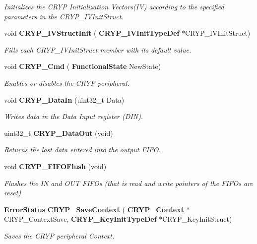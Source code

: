 \begin{DoxyCompactItemize}
\begin{DoxyCompactList}\small\item\em Initializes the C\+R\+YP Initialization Vectors(\+I\+V) according to the specified parameters in the C\+R\+Y\+P\+\_\+\+I\+V\+Init\+Struct. \end{DoxyCompactList}\item 
void \textbf{ C\+R\+Y\+P\+\_\+\+I\+V\+Struct\+Init} (\textbf{ C\+R\+Y\+P\+\_\+\+I\+V\+Init\+Type\+Def} $\ast$C\+R\+Y\+P\+\_\+\+I\+V\+Init\+Struct)
\begin{DoxyCompactList}\small\item\em Fills each C\+R\+Y\+P\+\_\+\+I\+V\+Init\+Struct member with its default value. \end{DoxyCompactList}\item 
void \textbf{ C\+R\+Y\+P\+\_\+\+Cmd} (\textbf{ Functional\+State} New\+State)
\begin{DoxyCompactList}\small\item\em Enables or disables the C\+R\+YP peripheral. \end{DoxyCompactList}\item 
void \textbf{ C\+R\+Y\+P\+\_\+\+Data\+In} (uint32\+\_\+t Data)
\begin{DoxyCompactList}\small\item\em Writes data in the Data Input register (D\+IN). \end{DoxyCompactList}\item 
uint32\+\_\+t \textbf{ C\+R\+Y\+P\+\_\+\+Data\+Out} (void)
\begin{DoxyCompactList}\small\item\em Returns the last data entered into the output F\+I\+FO. \end{DoxyCompactList}\item 
void \textbf{ C\+R\+Y\+P\+\_\+\+F\+I\+F\+O\+Flush} (void)
\begin{DoxyCompactList}\small\item\em Flushes the IN and O\+UT F\+I\+F\+Os (that is read and write pointers of the F\+I\+F\+Os are reset) \end{DoxyCompactList}\item 
\textbf{ Error\+Status} \textbf{ C\+R\+Y\+P\+\_\+\+Save\+Context} (\textbf{ C\+R\+Y\+P\+\_\+\+Context} $\ast$C\+R\+Y\+P\+\_\+\+Context\+Save, \textbf{ C\+R\+Y\+P\+\_\+\+Key\+Init\+Type\+Def} $\ast$C\+R\+Y\+P\+\_\+\+Key\+Init\+Struct)
\begin{DoxyCompactList}\small\item\em Saves the C\+R\+YP peripheral Context. \end{DoxyCompactList}\item 

\end{DoxyCompactItemize}

